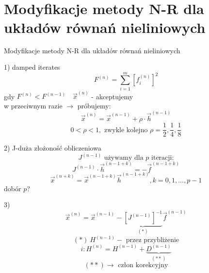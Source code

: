 \section{Modyfikacje metody N-R dla układów równań nieliniowych}

\begin{frame}{Modyfikacje metody N-R dla układów równań nieliniowych}
  \begin{block}{1) damped iterates}
    $$F^{(n)}=\sum_{i=1}^{m} [f_i^{(n)}]^2$$
    gdy $F^{(n)}<F^{(n-1)}\quad\overrightarrow{x}^{(n)}$ - akceptujemy\\
    w przeciwnym razie $\rightarrow$ próbujemy:
    $$\overrightarrow{x}^{(n)}=\overrightarrow{x}^{(n-1)}+\rho \cdot \overrightarrow{h}^{(n-1)}$$
    $$0<\rho<1,\text{ zwykle kolejno } \rho=\frac{1}{2},\frac{1}{4},\frac{1}{8}$$
  \end{block}
\end{frame}

\begin{frame}{}
  \begin{block}{2)}
    J-duża złożoność obliczeniowa
    $$J^{(n-1)}\text{ używamy dla }p\text{ iteracji:}$$
    $$J^{(n-1)} \cdot \overrightarrow{h}^{(n-1+k)}=-\overrightarrow{f}^{(n-1+k)}$$
    $$\overrightarrow{x}^{(n+k)}=\overrightarrow{x}^{(n-1+k)}\overrightarrow{h}^{(n-1+k)}, k=0,1,...,p-1$$
    dobór $p$?
  \end{block}
\end{frame}

\begin{frame}{}
  \begin{block}{3)}
    $$\overrightarrow{x}^{(n)}=\overrightarrow{x}^{(n-1)}-\underbrace{[J^{(n-1)}]^{-1}}_{(*)}\overrightarrow{f}^{(n-1)}$$
    $$(*)\ H^{(n-1)}-\text{ przez przybliżenie}$$
    $${i:H^{(n)}=H^{(n-1)}+\underbrace{D^{(n-1)}}_{(**)}}$$
    $$(**)\rightarrow\text{ człon korekcyjny}$$
  \end{block}
\end{frame}